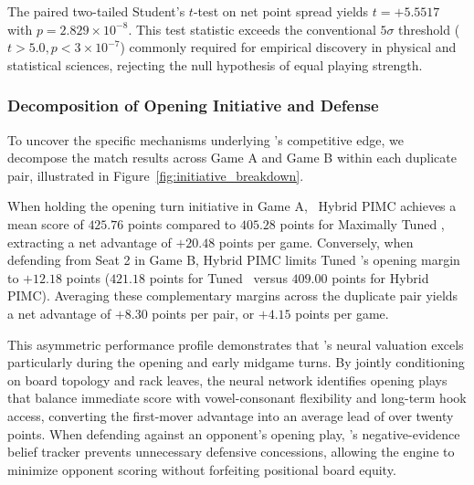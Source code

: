 The paired two-tailed Student's $t$-test on net point spread yields $t = +5.5517$ with $p = 2.829 \times 10^{-8}$. This test statistic exceeds the conventional $5\sigma$ threshold ($t > 5.0, p < 3 \times 10^{-7}$) commonly required for empirical discovery in physical and statistical sciences, rejecting the null hypothesis of equal playing strength.

\subsubsection{Decomposition of Opening Initiative and Defense}

To uncover the specific mechanisms underlying \algo's competitive edge, we decompose the match results across Game A and Game B within each duplicate pair, illustrated in Figure~\ref{fig:initiative_breakdown}.

When holding the opening turn initiative in Game A, \algo\ Hybrid PIMC achieves a mean score of $425.76$ points compared to $405.28$ points for Maximally Tuned \magpie, extracting a net advantage of $+20.48$ points per game. Conversely, when defending from Seat 2 in Game B, Hybrid PIMC limits Tuned \magpie's opening margin to $+12.18$ points ($421.18$ points for Tuned \magpie\ versus $409.00$ points for Hybrid PIMC). Averaging these complementary margins across the duplicate pair yields a net advantage of $+8.30$ points per pair, or $+4.15$ points per game.

This asymmetric performance profile demonstrates that \algo's neural valuation excels particularly during the opening and early midgame turns. By jointly conditioning on board topology and rack leaves, the neural network identifies opening plays that balance immediate score with vowel-consonant flexibility and long-term hook access, converting the first-mover advantage into an average lead of over twenty points. When defending against an opponent's opening play, \algo's negative-evidence belief tracker prevents unnecessary defensive concessions, allowing the engine to minimize opponent scoring without forfeiting positional board equity.

